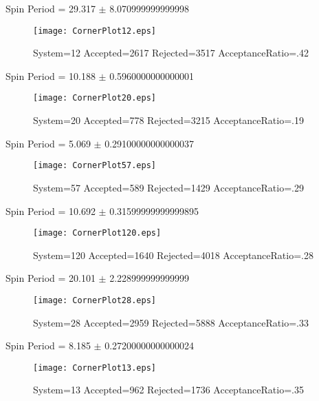 \documentclass[10pt]{article}
\begin{document}
\newpage
\begin{center}
        Spin Period = 29.317 $\pm$ 8.070999999999998
        \end{center}
\begin{figure}[H] 
        \texttt{[image: CornerPlot12.eps]}
        \caption{System=12 Accepted=2617 Rejected=3517 AcceptanceRatio=.42}
        \label{S12}
        \centering
        \end{figure}
\newpage
\begin{center}
        Spin Period = 10.188 $\pm$ 0.5960000000000001
        \end{center}
\begin{figure}[H] 
        \texttt{[image: CornerPlot20.eps]}
        \caption{System=20 Accepted=778 Rejected=3215 AcceptanceRatio=.19}
        \label{S20}
        \centering
        \end{figure}
\newpage
\begin{center}
        Spin Period = 5.069 $\pm$ 0.29100000000000037
        \end{center}
\begin{figure}[H] 
        \texttt{[image: CornerPlot57.eps]}
        \caption{System=57 Accepted=589 Rejected=1429 AcceptanceRatio=.29}
        \label{S57}
        \centering
        \end{figure}
\newpage
\begin{center}
        Spin Period = 10.692 $\pm$ 0.31599999999999895
        \end{center}
\begin{figure}[H] 
        \texttt{[image: CornerPlot120.eps]}
        \caption{System=120 Accepted=1640 Rejected=4018 AcceptanceRatio=.28}
        \label{S120}
        \centering
        \end{figure}
\newpage
\begin{center}
        Spin Period = 20.101 $\pm$ 2.228999999999999
        \end{center}
\begin{figure}[H] 
        \texttt{[image: CornerPlot28.eps]}
        \caption{System=28 Accepted=2959 Rejected=5888 AcceptanceRatio=.33}
        \label{S28}
        \centering
        \end{figure}
\newpage
\begin{center}
        Spin Period = 8.185 $\pm$ 0.27200000000000024
        \end{center}
\begin{figure}[H] 
        \texttt{[image: CornerPlot13.eps]}
        \caption{System=13 Accepted=962 Rejected=1736 AcceptanceRatio=.35}
        \label{S13}
        \centering
        \end{figure}
\end{document}
